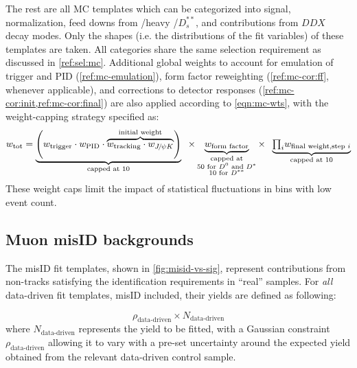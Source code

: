 The rest are all MC templates which can be categorized into signal,
normalization, feed downs from \Dstst/heavy \Dstst/$D^{**}_s$, and contributions
from $DDX$ decay modes.
Only the shapes (i.e. the distributions of the fit variables) of these templates
are taken.
All categories share the same selection requirement as discussed in
\cref{ref:sel:mc}.
Additional global weights to account for emulation of trigger and PID
(\cref{ref:mc-emulation}),
form factor reweighting (\cref{ref:mc-cor:ff}, whenever applicable),
and corrections to detector responses (\cref{ref:mc-cor:init,ref:mc-cor:final})
are also applied according to \cref{eqn:mc-wts},
with the weight-capping strategy specified as:
\begin{equation}
    w_\text{tot} = \underbrace{\left(
            w_\text{trigger} \cdot w_\text{PID} \cdot
            \overbrace{
                w_\text{tracking} \cdot w_{\jpsi\kaon}
            }^\text{initial weight}
        \right)}_\text{capped at 10} \;\; \times
        \underbrace{w_\text{form factor}}_{\substack{
            \text{capped at} \\
            \text{50 for \Dz and \Dstar} \\
            \text{10 for $D^{**}$}
        }} \times \;\;
        \underbrace{
            {\textstyle\prod_i} w_\text{final weight,step $i$}
        }_\text{capped at 10}
        \label{eqn:mc-wts}
\end{equation}
These weight caps limit the impact of statistical fluctuations in bins with low
event count.



\afterpage{
    
}


\subsection{Muon misID backgrounds}
\label{ref:fit:tmpl:misid}

The \muon misID fit templates,
shown in \cref{fig:misid-vs-sig},
represent contributions from non-\muon tracks satisfying the \muon
identification requirements in ``real'' \muon samples.
For \emph{all} data-driven fit templates, misID included,
their yields are defined as following:

\begin{equation}
    \rho_\text{data-driven} \times N_\text{data-driven}
\end{equation}
where $N_\text{data-driven}$ represents the yield to be fitted,
with a Gaussian constraint $\rho_\text{data-driven}$
allowing it to vary with a pre-set uncertainty around the expected yield
obtained from the relevant data-driven control sample.

